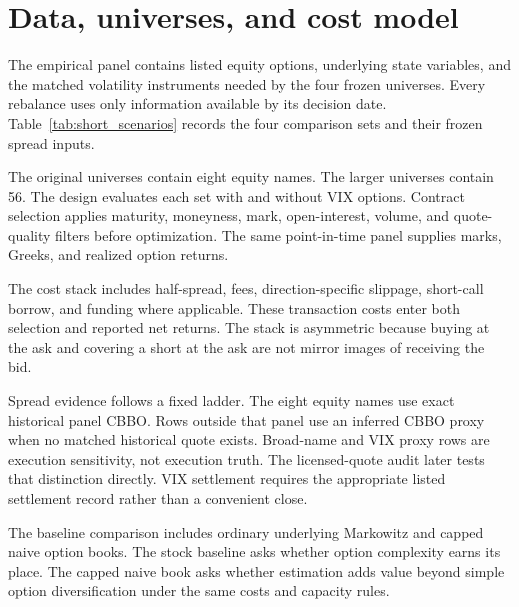 \section{Data, universes, and cost model}

The empirical panel contains listed equity options, underlying state variables, and the
matched volatility instruments needed by the four frozen universes. Every rebalance uses
only information available by its decision date. Table~\ref{tab:short_scenarios} records
the four comparison sets and their frozen spread inputs.

\begin{table}[!ht]
\centering
\caption{Frozen empirical universes and baseline evidence. Prototype net is the static
full-cost net Sharpe ratio used to describe the earlier development experiment.}
\label{tab:short_scenarios}
\resizebox{\textwidth}{!}{}
\end{table}

The original universes contain eight equity names. The larger universes contain 56. The
design evaluates each set with and without VIX options. Contract selection applies maturity,
moneyness, mark, open-interest, volume, and quote-quality filters before optimization.
The same point-in-time panel supplies marks, Greeks, and realized option returns.

The cost stack includes half-spread, fees, direction-specific slippage, short-call borrow,
and funding where applicable. These transaction costs enter both selection and reported
net returns. The stack is asymmetric because buying at the ask and covering a short at
the ask are not mirror images of receiving the bid.

Spread evidence follows a fixed ladder. The eight equity names use exact historical panel
CBBO. Rows outside that panel use an inferred CBBO proxy when no matched historical quote
exists. Broad-name and VIX proxy rows are execution sensitivity, not execution truth.
The licensed-quote audit later tests that distinction directly. VIX settlement requires
the appropriate listed settlement record rather than a convenient close.

The baseline comparison includes ordinary underlying Markowitz and capped naive option
books. The stock baseline asks whether option complexity earns its place. The capped naive
book asks whether estimation adds value beyond simple option diversification under the
same costs and capacity rules.

\FloatBarrier
